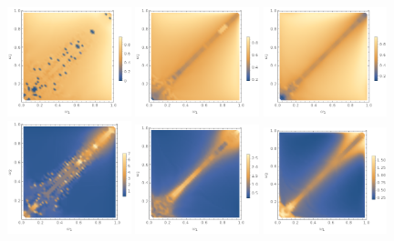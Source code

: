 \documentclass[%
reprint,
superscriptaddress,
amsmath,amssymb,
aps,
prl,
floatfix,
nofootinbib
]{revtex4-1}
\begin{document}
\begin{figure}
  \centering
    \includegraphics[width=0.32\textwidth]{plot/energy-ratio-axion-1d.png}
    \includegraphics[width=0.32\textwidth]{plot/energy-ratio-axion-2d.png}
    \includegraphics[width=0.32\textwidth]{plot/energy-ratio-axion-3d.png} \\\vskip-5pt
    \includegraphics[width=0.32\textwidth]{plot/r_max-axion-1d.png}
    \includegraphics[width=0.32\textwidth]{plot/r_max-axion-2d.png}
    \includegraphics[width=0.32\textwidth]{plot/r_max-axion-3d.png} \\\vskip-5pt

\end{figure}
\end{document}
